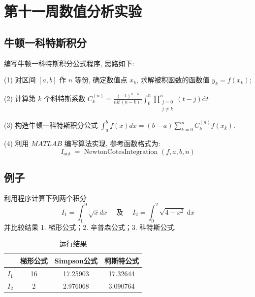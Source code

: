 \section{第十一周数值分析实验}
\subsection{牛顿一科特斯积分}
\begin{ex}
	编写牛顿一科特斯积分公式程序, 思路如下:
	
	(1) 对区间 $[a, b]$ 作 $n$ 等份, 确定数值点 $x_k$, 求解被积函数的函数值 $y_k=f\left(x_k\right)$;
	
	(2) 计算第 $k$ 个科特斯系数 $C_k^{(n)}=\frac{(-1)^{n-k}}{n k !(n-k) !} \int_0^n \prod_{\substack{j=0 \\ j \neq k}}^n(t-j) \mathrm{d} t$
	
	(3) 构造牛顿一科特斯积分公式 $\int_a^b f(x) d x=(b-a) \sum_{k=0}^n C_k^{(n)} f\left(x_k\right)$.
	
	(4) 利用 $M A T L A B$ 编写算法实现, 参考函数格式为:
	$$
	I_{\text {out }}=\text { NewtonCotesIntegration }(f, a, b, n)
	$$
\end{ex}

\subsection*{例子}
\begin{ex}
	利用程序计算下列两个积分
	$$
	I_1=\int_1^9 \sqrt{x} d x \quad \text { 及 } \quad I_2=\int_0^2 \sqrt{4-x^2} \mathrm{~d} x
	$$
	并比较结果
	1. 梯形公式；2. 辛普森公式；3. 科特斯公式.
\end{ex}

\qa 
\begin{table}[htbp]
	\centering
	\caption{运行结果}
	\begin{tabular}{l|ccc}
		& \multicolumn{1}{l}{梯形公式} & \multicolumn{1}{l}{Simpson公式} & \multicolumn{1}{l}{柯斯特公式} \\
		\hline
		$I_1$   & 16    & 17.25903 & 17.32644 \\
		$I_2$   & 2     & 2.976068 & 3.090764 \\
	\end{tabular}%
	\label{tab:addlabel11}%
\end{table}%

